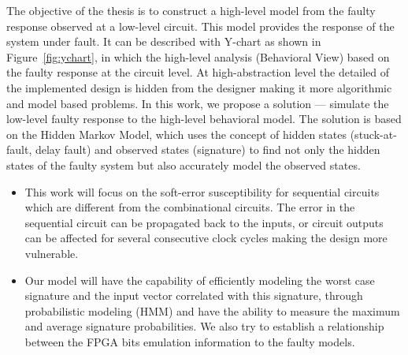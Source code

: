 The objective of the thesis is to construct a high-level model from the faulty response observed at a low-level circuit. This model provides the response of the system under fault. It can be described with Y-chart as shown in Figure~\ref{fig:ychart}, in which the high-level analysis (Behavioral View) based on the faulty response at the circuit level. At high-abstraction level the detailed of the implemented design is hidden from the designer making it more algorithmic and model based problems. In this work, we propose a solution --- simulate the low-level faulty response to the high-level behavioral model. The solution is based on the Hidden Markov Model, which uses the concept of hidden states  (stuck-at-fault, delay fault) and observed states (signature) to find not only the hidden states of the faulty system but also accurately model the observed states. 

\begin{itemize}
\item This work will focus on the soft-error susceptibility for sequential circuits which are different from the combinational circuits. The error in the sequential circuit can be propagated back to the inputs, or circuit outputs can be affected for several consecutive clock cycles making the design more vulnerable.  
\item Our model will have the capability of efficiently modeling the worst case signature and the input vector correlated with this signature, through probabilistic modeling (HMM) and have the ability to measure the maximum and average signature probabilities. We also try to establish a relationship between the FPGA bits emulation information to the faulty models.

\end{itemize}
